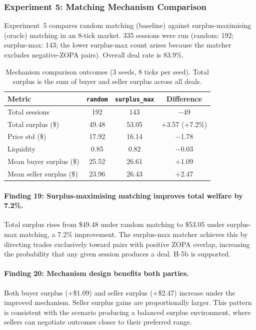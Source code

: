 \subsubsection{Experiment 5: Matching Mechanism Comparison}
\label{sec:results-mechanism}

Experiment~5 compares random matching (baseline) against surplus-maximising (oracle) matching in an 8-tick market.  335 sessions were run (random: 192; surplus-max: 143; the lower surplus-max count arises because the matcher excludes negative-ZOPA pairs).  Overall deal rate is 83.9\%.

\begin{table}[ht]
\centering
\caption{Mechanism comparison outcomes (3 seeds, 8 ticks per seed).  Total surplus is the sum of buyer and seller surplus across all deals.}
\label{tab:mechanism}
\begin{tabular}{@{}lccc@{}}
\toprule
Metric & \texttt{random} & \texttt{surplus\_max} & Difference \\
\midrule
Total sessions           & 192     & 143     & $-$49 \\
Total surplus (\$)       & 49.48   & 53.05   & $+$3.57 ($+$7.2\%) \\
Price std (\$)           & 17.92   & 16.14   & $-$1.78 \\
Liquidity                & 0.85    & 0.82    & $-$0.03 \\
Mean buyer surplus (\$)  & 25.52   & 26.61   & $+$1.09 \\
Mean seller surplus (\$) & 23.96   & 26.43   & $+$2.47 \\
\bottomrule
\end{tabular}
\end{table}

\paragraph{Finding 19: Surplus-maximising matching improves total welfare by 7.2\%.}
Total surplus rises from \$49.48 under random matching to \$53.05 under surplus-max matching, a 7.2\% improvement.  The surplus-max matcher achieves this by directing trades exclusively toward pairs with positive ZOPA overlap, increasing the probability that any given session produces a deal.  H-5b is supported.

\paragraph{Finding 20: Mechanism design benefits both parties.}
Both buyer surplus (+\$1.09) and seller surplus (+\$2.47) increase under the improved mechanism.  Seller surplus gains are proportionally larger.  This pattern is consistent with the scenario producing a balanced surplus environment, where sellers can negotiate outcomes closer to their preferred range.

